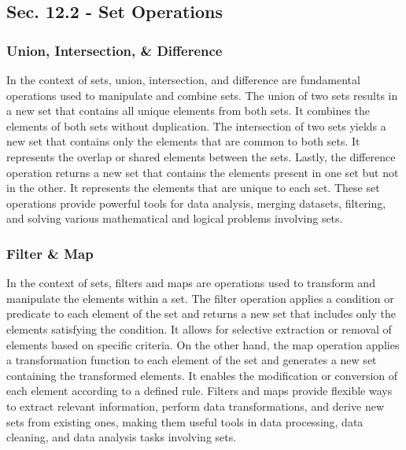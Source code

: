 \subsection*{Sec. 12.2 - Set Operations}

\subsubsection{Union, Intersection, \& Difference}

In the context of sets, union, intersection, and difference are fundamental operations used to manipulate and combine sets. The union of two sets results in a new set that contains all unique elements from both sets. It combines the elements of both sets without duplication. The intersection of two sets yields a new set that contains only the 
elements that are common to both sets. It represents the overlap or shared elements between the sets. Lastly, the difference operation returns a new set that contains the elements present in one set but not in the other. It represents the elements that are unique to each set. These set operations provide powerful tools for data analysis, merging 
datasets, filtering, and solving various mathematical and logical problems involving sets.

\subsubsection{Filter \& Map}

In the context of sets, filters and maps are operations used to transform and manipulate the elements within a set. The filter operation applies a condition or predicate to each element of the set and returns a new set that includes only the elements satisfying the condition. It allows for selective extraction or removal of elements based on specific 
criteria. On the other hand, the map operation applies a transformation function to each element of the set and generates a new set containing the transformed elements. It enables the modification or conversion of each element according to a defined rule. Filters and maps provide flexible ways to extract relevant information, perform data transformations, 
and derive new sets from existing ones, making them useful tools in data processing, data cleaning, and data analysis tasks involving sets.

